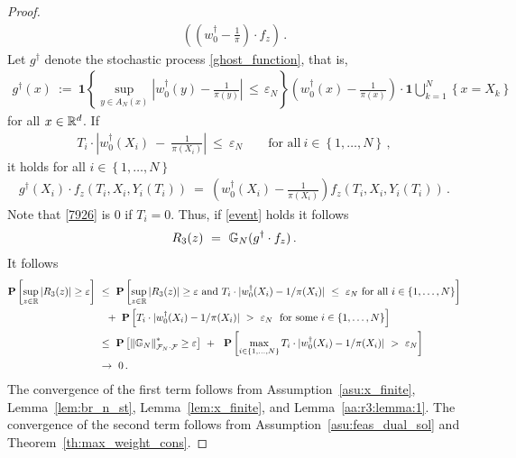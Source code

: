 \begin{proof}
\begin{align*}
    \left( 
      \left( 
      w_0^\dagger
      -
      \frac{1}{\pi}
      \right)
     \cdot
     f_z
    \right)
    \,.
  \end{align*}
Let
  $g^\dagger$ 
  denote the stochastic process \eqref{ghost_function}, that is,
\begin{align*}
  g^\dagger
  (x)
  \ 
  :=
  \ 
  \mathbf{1}{
    \left\{ 
      \sup_{y\in A_N(x)}
      \left| 
      w_0^\dagger(y)
      -
      \frac{1}{\pi(y)}
      \right|
      \,
      \le
      \,
      \varepsilon_N
    \right\}
  }
  \left( 
    w_0^\dagger(x)
      -
      \frac{1}{\pi(x)}
  \right)
  \cdot
  \mathbf{1}
  \bigcup_{k=1}^N
  \left\{ 
    x=X_k
  \right\}
\end{align*}
for all $x\in\mathbb{R}^d$.
  If
  \begin{gather}
    \label{event}
    T_i
    \cdot
    \left| 
    w_0^\dagger(X_i)
    \ 
    -
    \ 
    \frac{1}{\pi(X_i)} 
    \right|
    \ 
    \le
    \ 
    \varepsilon_N
    \qquad
    \text{for all}\ 
    i\in \left\{ 1,\ldots,N \right\}
    \,,
  \end{gather}
  it holds
  for all $i\in \left\{ 1,\ldots,N \right\}$
  \begin{gather}
    \label{7926}
    g^\dagger
    (X_i)
    \cdot
    f_z
    (T_i,X_i,Y_i(T_i))
    \ 
    =
    \ 
  \left( 
      w_0^\dagger(X_i)
      -
      \frac{1}{\pi(X_i)}
  \right)
    f_z
    (T_i,X_i,Y_i(T_i))
      \,.
  \end{gather}
  Note that \eqref{7926} is $0$ if $T_i=0$. 
  Thus, if \eqref{event} holds it follows
\begin{align*}
 R_3(z)
 \ 
 =
 \ 
 \G_N(g^\dagger \cdot f_z)
 \,.
\end{align*}
  It follows
\begin{align*}
    \P
    \left[ 
      \sup_{z\in\R}
     | 
    R_3(z)
    |
      \ge
      \varepsilon
    \right]
    &
    \ 
    \le
    \ 
    \P
    \left[ 
      \sup_{z\in\R}
     | 
    R_3(z)
    |
      \ge
      \varepsilon
      \ 
      \text{and}
      \ 
      T_i\cdot
    | 
    w_0^\dagger(X_i)- 1/\pi(X_i)
    |
    \ 
    \le
    \ 
    \varepsilon_N
    \ \text{for all}\ i\in\{1,\ldots,N\}
    \right]
    \\
    &
    \quad
    +
    \ 
    \P
    \left[ 
      T_i\cdot
    | 
    w_0^\dagger(X_i)- 1/\pi(X_i)
    |
    \ 
    >
    \ 
    \varepsilon_N
    \ 
    \ \text{for some}\ i\in\{1,\ldots,N\}
    \right]
    \\
    &
    \ 
    \le
    \ 
    \P
    \left[ 
      \norm{\G_N}^*_{\mathcal{F}_N\cdot\mathcal{F}}
      \ge
      \varepsilon
    \right]
    \ 
    +
    \ 
    \ 
    \P
    \left[ 
      \max_{i\in \left\{ 1,\ldots,N \right\}}
      T_i\cdot
    | 
    w_0^\dagger(X_i)- 1/\pi(X_i)
    |
    \ 
    >
    \ 
    \varepsilon_N
    \right]
    \\
    &
    \ 
    \to
    \ 
    0
    \,.
\end{align*}
The convergence of the first term follows from
Assumption~\ref{asu:x_finite},
Lemma~\ref{lem:br_n_st},
Lemma~\ref{lem:x_finite}, and
Lemma~\ref{aa:r3:lemma:1}.
The convergence of the second term follows from
Assumption~\ref{asu:feas_dual_sol} and
Theorem~\ref{th:max_weight_cons}.
\end{proof}
